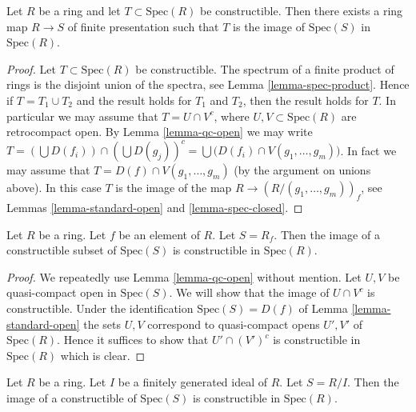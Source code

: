 \begin{lemma}
\label{lemma-constructible-is-image}
Let $R$ be a ring and let $T \subset \text{Spec}(R)$
be constructible. Then there exists a ring map $R \to S$ of
finite presentation such that $T$ is the image of
$\text{Spec}(S)$ in $\text{Spec}(R)$.
\end{lemma}

\begin{proof}
Let $T \subset \text{Spec}(R)$ be constructible.
The spectrum of a finite product of rings 
is the disjoint union of the spectra, see
Lemma \ref{lemma-spec-product}. Hence if $T = T_1 \cup T_2$
and the result holds for $T_1$ and $T_2$, then the
result holds for $T$. In particular we may assume
that $T = U \cap V^c$, where $U, V \subset \text{Spec}(R)$
are retrocompact open. By Lemma \ref{lemma-qc-open} we may write
$T = (\bigcup D(f_i)) \cap (\bigcup D(g_j))^c = 
\bigcup \big(D(f_i) \cap V(g_1,\ldots,g_m)\big)$.
In fact we may assume that $T = D(f) \cap V(g_1,\ldots,g_m)$
(by the argument on unions above).
In this case $T$ is the image of the map
$R \to (R/(g_1,\ldots,g_m))_f$, see Lemmas
\ref{lemma-standard-open} and \ref{lemma-spec-closed}.
\end{proof}

\begin{lemma}
\label{lemma-open-fp}
Let $R$ be a ring.
Let $f$ be an element of $R$.
Let $S = R_f$.
Then the image of a constructible subset of $\text{Spec}(S)$
is constructible in $\text{Spec}(R)$.
\end{lemma}

\begin{proof}
We repeatedly use Lemma \ref{lemma-qc-open} without mention.
Let $U, V$ be quasi-compact open in $\text{Spec}(S)$.
We will show that the image of $U \cap V^c$ is constructible.
Under the identification
$\text{Spec}(S) = D(f)$ of Lemma \ref{lemma-standard-open}
the sets $U, V$ correspond to quasi-compact opens
$U', V'$ of $\text{Spec}(R)$.
Hence it suffices to show that $U' \cap (V')^c$
is constructible in $\text{Spec}(R)$ which is clear.
\end{proof}

\begin{lemma}
\label{lemma-closed-fp}
Let $R$ be a ring.
Let $I$ be a finitely generated ideal of $R$.
Let $S = R/I$.
Then the image of a constructible of $\text{Spec}(S)$
is constructible in $\text{Spec}(R)$.
\end{lemma}

